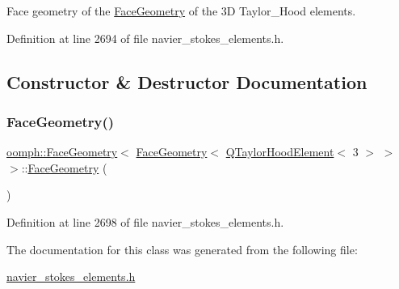 Face geometry of the \hyperlink{classoomph_1_1FaceGeometry}{Face\+Geometry} of the 3D Taylor\+\_\+\+Hood elements. 

Definition at line 2694 of file navier\+\_\+stokes\+\_\+elements.\+h.



\subsection{Constructor \& Destructor Documentation}
\mbox{\label{classoomph_1_1FaceGeometry_3_01FaceGeometry_3_01QTaylorHoodElement_3_013_01_4_01_4_01_4_a4c27dabd8bc9da16e195b1ba5b961981}} 
\subsubsection{\texorpdfstring{Face\+Geometry()}{FaceGeometry()}}
{\footnotesize\ttfamily \hyperlink{classoomph_1_1FaceGeometry}{oomph\+::\+Face\+Geometry}$<$ \hyperlink{classoomph_1_1FaceGeometry}{Face\+Geometry}$<$ \hyperlink{classoomph_1_1QTaylorHoodElement}{Q\+Taylor\+Hood\+Element}$<$ 3 $>$ $>$ $>$\+::\hyperlink{classoomph_1_1FaceGeometry}{Face\+Geometry} (\begin{DoxyParamCaption}{ }\end{DoxyParamCaption})\hspace{0.3cm}{\ttfamily [inline]}}



Definition at line 2698 of file navier\+\_\+stokes\+\_\+elements.\+h.



The documentation for this class was generated from the following file\+:\begin{DoxyCompactItemize}
\item 
\hyperlink{navier__stokes__elements_8h}{navier\+\_\+stokes\+\_\+elements.\+h}\end{DoxyCompactItemize}
